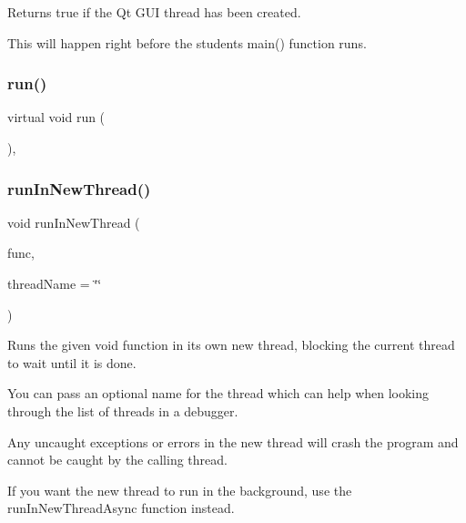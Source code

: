 Returns true if the Qt G\+UI thread has been created. 

This will happen right before the student\textquotesingle{}s main() function runs. \mbox{\label{classsgl_1_1GThread_a18954417d3124a8095783ea13dc6d00b}} 
\subsubsection{\texorpdfstring{run()}{run()}}
{\footnotesize\ttfamily virtual void run (\begin{DoxyParamCaption}{ }\end{DoxyParamCaption})\hspace{0.3cm}{\ttfamily [protected]}, {}}

\mbox{\label{classsgl_1_1GThread_ad70a32318f3f0a9cf25582379c6d7ffb}} 
\subsubsection{\texorpdfstring{run\+In\+New\+Thread()}{runInNewThread()}}
{\footnotesize\ttfamily void run\+In\+New\+Thread (\begin{DoxyParamCaption}\item[{\mbox{\hyperlink{namespacesgl_aa508400d1219d217e0e9509ff59a58f4}{G\+Thunk}}}]{func,  }\item[{const std\+::string \&}]{thread\+Name = {\ttfamily \char`\"{}\char`\"{}} }\end{DoxyParamCaption})\hspace{0.3cm}{\ttfamily [static]}}



Runs the given void function in its own new thread, blocking the current thread to wait until it is done. 

You can pass an optional name for the thread which can help when looking through the list of threads in a debugger.

Any uncaught exceptions or errors in the new thread will crash the program and cannot be caught by the calling thread.

If you want the new thread to run in the background, use the {\ttfamily run\+In\+New\+Thread\+Async} function instead. \mbox{\label{classsgl_1_1GThread_aee1af0236d033fce36073899bb4368ed}} 
